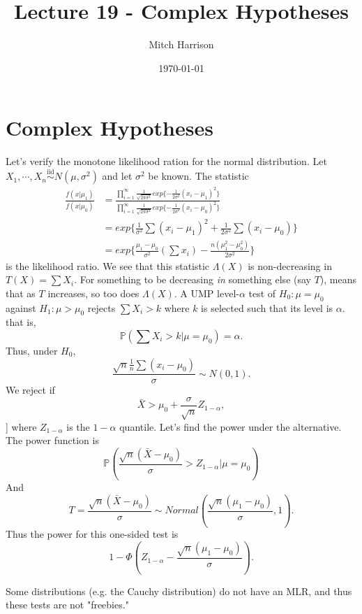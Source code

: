 \documentclass[titlepage, 12pt, leqno]{article}
\title{\Huge{Lecture 19 - Complex Hypotheses}}
\author{\large{Mitch Harrison}}
\date{\today}
\begin{document}
\setlength{\parskip}{1\baselineskip}
\setlength{\parindent}{15pt}
\maketitle
\tableofcontents
\newpage


\section{Complex Hypotheses}

Let's verify the monotone likelihood ration for the normal distribution. Let
$X_{1}, \cdots ,X_{n} \overset{\mathrm{iid}}{\sim}N(\mu, \sigma^{2})$ and let
$\sigma^{2}$ be known. The statistic
\begin{align*}
\frac{f(x|\mu_{1})}{f(x|\mu_{0})} 
&=
\frac{ \prod_{i=1}^{\infty}\frac{1}{\sqrt{2\pi\sigma^{2}}}exp\{
-\frac{1}{2\sigma^{2}}(x_{i} - \mu_{1})^{2}\}}{
\prod_{i=1}^{\infty}\frac{1}{\sqrt{2\pi\sigma^{2}}}exp\{
-\frac{1}{2\sigma^{2}}(x_{i} - \mu_{0})^{2}\}}{
}  \\
&= exp\{\frac{1}{\sigma^{2}}\sum (x_{i}-\mu_{1})^{2} + \frac{1}{2\sigma^{2}}
    \sum (x_{i}-\mu_{0})\} \\
&=
exp\{\frac{\mu_{1} - \mu_{0}}{\sigma^{2}}(\sum x_{i}) - \frac{n(\mu_{1}^{2} -
\mu_{0}^{2})}{2\sigma^{2}}\}
\end{align*}
is the likelihood ratio. We see that this statistic $\Lambda(X)$ is 
non-decreasing in $T(X) = \sum X_{i}$. For something to be decreasing \textit{in}
something else (say $T$), means that as $T$ increases, so too does
$\Lambda(X)$. A UMP level-$\alpha$ test of $H_{0}:\mu = \mu_{0}$ against
$H_{1}:\mu > \mu_{0}$ rejects $\sum X_{i} > k$ where $k$ is selected such that
its level is $\alpha$. that is,
\[
\mathbb{P}(\sum X_{i} > k | \mu = \mu_{0}) = \alpha.
\]
Thus, under $H_{0}$,
\[
\frac{\sqrt{n}\frac{1}{n}\sum(x_{i} - \mu_{0})}{\sigma} \sim N(0,1).
\]
We reject if 
\[
\bar X > \mu_{0}+\frac{\sigma}{\sqrt{n}}Z_{1-\alpha},
\]]
where $Z_{1-\alpha}$ is the $1-\alpha$ quantile. Let's find the power under the alternative. The power function is
\[
\mathbb{P}\left(\frac{\sqrt{n}(\bar X - \mu_{0})}{\sigma} > Z_{1-\alpha} |
    \mu = \mu_{0}\right)
\]
And
\[
T = \frac{\sqrt{n}(\bar X - \mu_{0})}{\sigma} \sim 
Normal\left( \frac{\sqrt{n}(\mu_{1} - \mu_{0})}{\sigma}, 1\right).
\]
Thus the power for this one-sided test is
\[
1 - \Phi\left(Z_{1-\alpha}-\frac{\sqrt{n}(\mu_{1} - \mu_{0})}{\sigma}\right).
\]
\begin{note}
    Some distributions (e.g. the Cauchy distribution) do not have an MLR, and 
    thus these tests are not "freebies."
\end{note}
\end{document}
